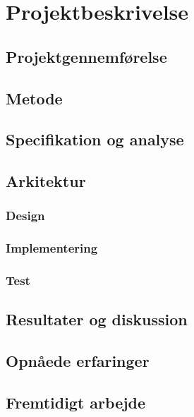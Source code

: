 \chapter{Projektbeskrivelse}

\section{Projektgennemførelse}


\section{Metode} 




\section{Specifikation og analyse}



\section{Arkitektur}



\subsection{Design}
   

\subsection{Implementering}


\subsection{Test}


\section{Resultater og diskussion}


\section{Opnåede erfaringer}


\section{Fremtidigt arbejde}
